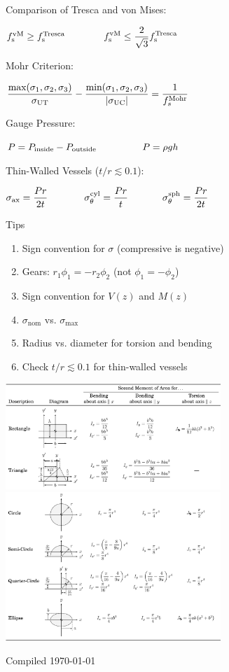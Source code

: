 \documentclass[10pt]{article}
\makeatletter
\newcommand{\ds}{\displaystyle}
\newcommand{\tab}{\hspace{.02\textwidth}}
\newcommand{\twoEqn}[4]{$\makebox[#3][l]{$#1$} \makebox[#4][l]{$#2$}$}
\newcommand{\threeEqn}[6]{$\makebox[#4][l]{$#1$} \makebox[#5][l]{$#2$} \makebox[#6][l]{$#3$}$}
\newcommand{\abs}[1]{\left|#1\right|}
\let\originalleft\left
\let\originalright\right
\renewcommand{\left}{\mathopen{}\mathclose\bgroup\originalleft}
\renewcommand{\right}{\aftergroup\egroup\originalright}
\renewcommand{\section}{\@startsection{section}{1}{0ex}
                                {-2ex}
                                {0.7ex}
                                {\normalfont\large\bfseries}}
\renewcommand{\max}{\text{max}}
\renewcommand{\min}{\text{min}}
\newcommand{\nom}{\text{nom}}
\newcommand{\s}{\text{s}}
\newcommand{\UT}{\text{UT}}
\newcommand{\UC}{\text{UC}}
\newcommand{\Tresca}{\text{Tresca}}
\newcommand{\vM}{\text{vM}}
\newcommand{\Mohr}{\text{Mohr}}
\newcommand{\inside}{\text{inside}}
\newcommand{\outside}{\text{outside}}
\newcommand{\ax}{\text{ax}}
\newcommand{\cyl}{\text{cyl}}
\newcommand{\sph}{\text{sph}}
\makeatother
\begin{document}
\begin{multicols*}{3}
Comparison of Tresca and von Mises:

\tab\twoEqn{f_\s^\vM\ge f_\s^\Tresca}{\ds f_\s^\vM\le\frac{2}{\sqrt 3}f_\s^\Tresca}{10em}{10em}

Mohr Criterion:

\tab $\ds\frac{\max(\sigma_1,\sigma_2,\sigma_3)}{\sigma_\UT}-\frac{\min(\sigma_1,\sigma_2,\sigma_3)}{\abs{\sigma_\UC}}=\frac{1}{f_s^\Mohr}$

Gauge Pressure:

\tab\twoEqn{P=P_\inside-P_\outside}{P=\rho gh}{14em}{8em}

Thin-Walled Vessels ($t/r\lesssim 0.1$):

\tab\threeEqn{\ds\sigma_\ax=\frac{Pr}{2t}}{\ds\sigma_\theta^\cyl=\frac{Pr}{t}}{\ds\sigma_\theta^\sph=\frac{Pr}{2t}}{8em}{8em}{6em}

\section{Tips}
\begin{enumerate}[itemsep=0pt, topsep=0pt]
    \item Sign convention for $\sigma$ (compressive is negative)
    \item Gears: $r_1\phi_1=-r_2\phi_2$ (not $\phi_1=-\phi_2$)
    \item Sign convention for $V(z)$ and $M(z)$
    \item $\sigma_{\nom}$ vs. $\sigma_{\max}$
    \item Radius vs. diameter for torsion and bending
    \item Check $t/r\lesssim 0.1$ for thin-walled vessels
\end{enumerate}

\newcolumn
\includegraphics[width=0.61\textwidth]{images/moments_of_area_1.png}
\includegraphics[width=0.61\textwidth]{images/moments_of_area_2.png}


\scriptsize 
Compiled \today

\end{multicols*}
\end{document}
